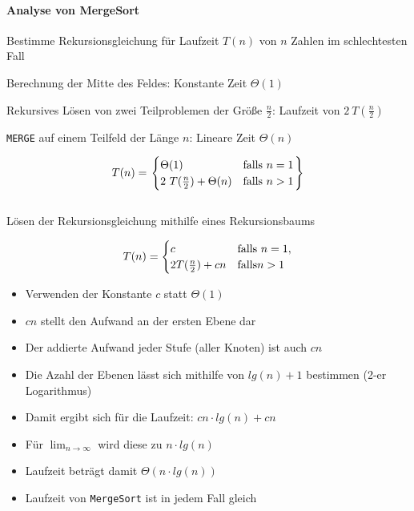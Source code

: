 \documentclass[
    ngerman,
    color=3b,
    dark_mode,
    load_common, %
    summary,
    boxarc,
]{rubos-tuda-template}
\begin{document}
\paragraph{Analyse von MergeSort}\mbox{}
\begin{description}[leftmargin=2cm]
    \item [Ziel] Bestimme Rekursionsgleichung für Laufzeit $T(n)$ von $n$ Zahlen im schlechtesten Fall
    \item [Divide] Berechnung der Mitte des Feldes: Konstante Zeit $\Theta(1)$
    \item [Conquer] Rekursives Lösen von zwei Teilproblemen der Grö\ss{}e $\frac{n}{2}$: Laufzeit von $2~T(\frac{n}{2})$
    \item [Combine] \texttt{MERGE} auf einem Teilfeld der Länge $n$: Lineare Zeit $\Theta(n)$
\end{description}
\[
    T(n) = \left.
    \begin{cases}
        \hiderowcolors
        \Theta(1)                    & \text{falls } n = 1 \\
        2~T(\frac{n}{2}) + \Theta(n) & \text{falls } n > 1 \\
    \end{cases}
    \right \}
\]\\
Lösen der Rekursionsgleichung mithilfe eines Rekursionsbaums

\begin{equation*}T(n)=\begin{cases}\hiderowcolors
        c                  & \text{falls } n=1, \\
        2T(\frac{n}{2})+cn & \text{falls}n>1    \\
    \end{cases}
\end{equation*}
\begin{center}
    
\end{center}
\begin{itemize}
    \item Verwenden der Konstante $c$ statt $\Theta(1)$
    \item $cn$ stellt den Aufwand an der ersten Ebene dar
    \item Der addierte Aufwand jeder Stufe (aller Knoten) ist auch $cn$
    \item Die Azahl der Ebenen lässt sich mithilfe von $lg(n) + 1$ bestimmen (2-er Logarithmus)
    \item Damit ergibt sich für die Laufzeit: $cn \cdot lg(n)+cn$
    \item Für $\lim_{n \rightarrow \infty}$ wird diese zu $n \cdot lg(n)$
    \item Laufzeit beträgt damit $\Theta(n \cdot lg(n))$
    \item Laufzeit von \texttt{MergeSort} ist in jedem Fall gleich
\end{itemize}
\end{document}

